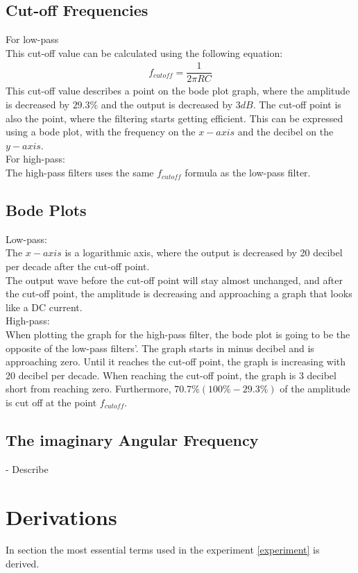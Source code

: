 \subsection{Cut-off Frequencies}
For low-pass \\
This cut-off value can be calculated using the following equation:
\begin{align*}
f_{cutoff}=\dfrac{1}{2 \pi RC}
\end{align*}
This cut-off value describes a point on the bode plot graph, where the amplitude is decreased by $29.3\%$ and the output is decreased by $3dB$. The cut-off point is also the point, where the filtering starts getting efficient. This can be expressed using a bode plot, with the frequency on the $x-axis$ and the decibel on the $y-axis$.\\
For high-pass: \\
The high-pass filters uses the same $f_{cutoff}$ formula as the low-pass filter.

\subsection{Bode Plots}
Low-pass: \\
The $x-axis$ is a logarithmic axis, where the output is decreased by 20 decibel per decade after the cut-off point. \\
The output wave before the cut-off point will stay almost unchanged, and after the cut-off point, the amplitude is decreasing and approaching a graph that looks like a DC current. \\
High-pass: \\
When plotting the graph for the high-pass filter, the bode plot is going to be the opposite of the low-pass filters'. The graph starts in minus decibel and is approaching zero. Until it reaches the cut-off point, the graph is increasing with 20 decibel per decade. When reaching the cut-off point, the graph is 3 decibel short from reaching zero. Furthermore, $70.7\% (100\%-29.3\%)$ of the amplitude is cut off at the point $f_{cutoff}$.
\subsection{The imaginary Angular Frequency}
- Describe
\section{Derivations} \label{Derivations}
In section the most essential terms used in the experiment \ref{experiment} is derived. 
